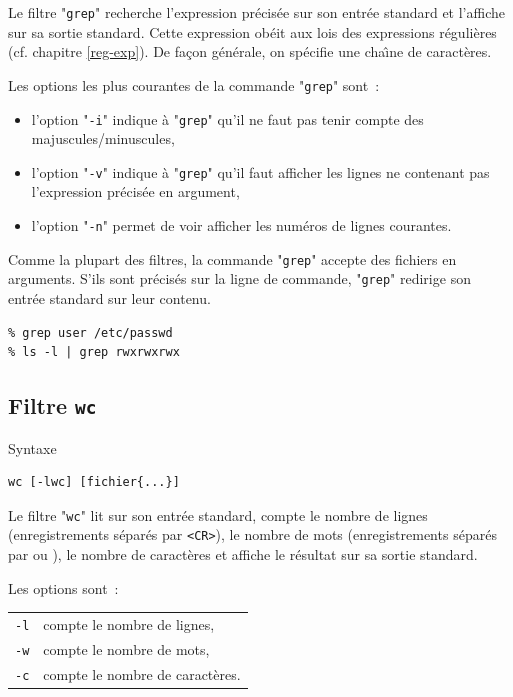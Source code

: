 {Le filtre "{\tt grep}" recherche l'expression pr{\'e}cis{\'e}e sur son entr{\'e}e
standard et l'affiche sur sa sortie standard. Cette expression ob{\'e}it aux
lois des expressions r{\'e}guli{\`e}res {\Unix} (cf. chapitre \ref{reg-exp}).
De fa\c{c}on g{\'e}n{\'e}rale, on sp{\'e}cifie une cha{\^\i}ne de caract{\`e}res.

Les options les plus courantes de la commande "{\tt grep}" sont~:
\begin{itemize}
	\item l'option "{\tt -i}" indique {\`a} "{\tt grep}" qu'il ne faut pas
		  tenir compte des majuscules/minuscules,
	\item l'option "{\tt -v}" indique {\`a} "{\tt grep}" qu'il faut afficher
		  les lignes ne contenant pas l'expression pr{\'e}cis{\'e}e en argument,
	\item l'option "{\tt -n}" permet de voir afficher les num{\'e}ros de
		  lignes courantes.
\end{itemize}

Comme la plupart des filtres, la commande "{\tt grep}" accepte des
fichiers en arguments. S'ils sont pr{\'e}cis{\'e}s sur la ligne de commande,
"{\tt grep}" redirige son entr{\'e}e standard sur leur contenu.

\begin{example}
\begin{verbatim}
% grep user /etc/passwd
% ls -l | grep rwxrwxrwx
\end{verbatim}
\end{example}

\subsection{Filtre {\tt wc}}

\begin{definition}{Syntaxe}
\begin{verbatim}
wc [-lwc] [fichier{...}]
\end{verbatim}
\end{definition}

Le filtre "{\tt wc}" lit sur son entr{\'e}e standard,  compte le nombre
de lignes (enregistrements s{\'e}par{\'e}s par \verb=<CR>=), le nombre de mots
(enregistrements s{\'e}par{\'e}s par \spacekey ou \tabkey), le nombre de
caract{\`e}res et affiche le r{\'e}sultat sur sa sortie standard.

Les options sont~:\\
\begin{tabular}{l@{\hspace{0.5cm}}l}
	{\tt -l}	&	compte le nombre de lignes,\\
	{\tt -w}	&	compte le nombre de mots,\\
	{\tt -c}	&	compte le nombre de caract{\`e}res.
\end{tabular}

}
